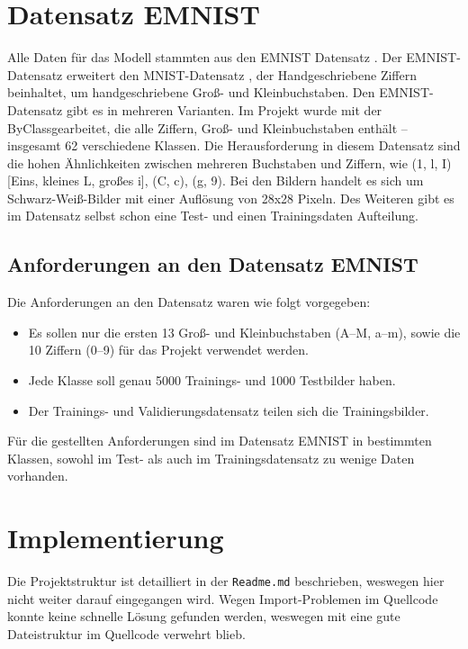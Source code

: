 \documentclass[12pt,oneside]{article}
\begin{document}
  \section{Datensatz EMNIST}
  Alle Daten für das Modell stammten aus den EMNIST Datensatz \cite{noauthor_emnist_nodate}. Der EMNIST-Datensatz erweitert den MNIST-Datensatz \cite{noauthor_mnist_nodate}, der Handgeschriebene Ziffern beinhaltet, um handgeschriebene Groß- und Kleinbuchstaben. Den EMNIST-Datensatz gibt es in mehreren Varianten. Im Projekt wurde mit der \glqq ByClass\grqq gearbeitet, die alle Ziffern, Groß- und Kleinbuchstaben enthält – insgesamt 62 verschiedene Klassen. Die Herausforderung in diesem Datensatz sind die hohen Ähnlichkeiten zwischen mehreren Buchstaben und Ziffern, wie (1, l, I) [Eins, kleines L, großes i], (C, c), (g, 9). Bei den Bildern handelt es sich um Schwarz-Weiß-Bilder mit einer Auflösung von 28x28 Pixeln. Des Weiteren gibt es im Datensatz selbst schon eine Test- und einen Trainingsdaten Aufteilung.
  
  \subsection{Anforderungen an den Datensatz EMNIST}
  Die Anforderungen an den Datensatz waren wie folgt vorgegeben:
  \begin{itemize}
  	\item{Es sollen nur die ersten 13 Groß- und Kleinbuchstaben (A--M, a--m), sowie die 10 Ziffern (0--9) für das Projekt verwendet werden.}
  	\item{Jede Klasse soll genau 5000 Trainings- und 1000 Testbilder haben.}
  	\item{Der Trainings- und Validierungsdatensatz teilen sich die Trainingsbilder.}
  \end{itemize}
  
  Für die gestellten Anforderungen sind im Datensatz EMNIST in bestimmten Klassen, sowohl im Test- als auch im Trainingsdatensatz zu wenige Daten vorhanden.
  
  
  \section{Implementierung}
  Die Projektstruktur ist detailliert in der \texttt{Readme.md} beschrieben, weswegen hier nicht weiter darauf eingegangen wird. Wegen Import-Problemen im Quellcode konnte keine schnelle Lösung gefunden werden, weswegen mit eine gute Dateistruktur im Quellcode verwehrt blieb.
  
\end{document}
